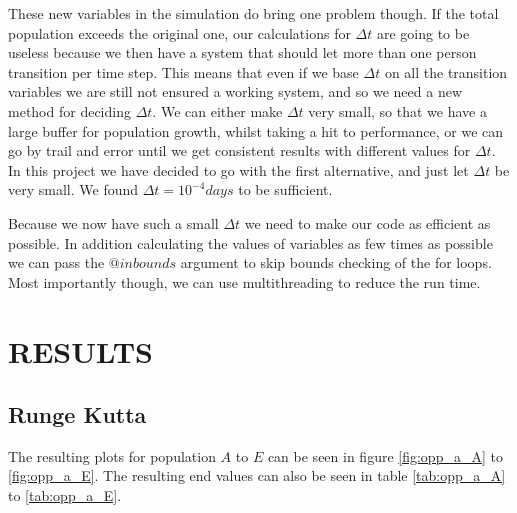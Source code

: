 \documentclass[a4paper]{article}
\let\Oldsection\section
\renewcommand{\section}{\FloatBarrier\Oldsection}
\let\Oldsubsection\subsection
\renewcommand{\subsection}{\FloatBarrier\Oldsubsection}
\begin{document}
	These new variables in the simulation do bring one problem though. If the total population exceeds the original one, our calculations for $\Delta t$ are going to be useless because we then have a system that should let more than one person transition per time step. This means that even if we base $\Delta t$ on all the transition variables we are still not ensured a working system, and so we need a new method for deciding $\Delta t$. We can either make $\Delta t$ very small, so that we have a large buffer for population growth, whilst taking a hit to performance, or we can go by trail and error until we get consistent results with different values for $\Delta t$. In this project we have decided to go with the first alternative, and just let $\Delta t$ be very small. We found $\Delta t = 10^{-4}days$ to be sufficient.
	
	Because we now have such a small $\Delta t$ we need to make our code as efficient as possible. In addition calculating the values of variables as few times as possible we can pass the $@inbounds$ argument to skip bounds checking of the for loops. Most importantly though, we can use multithreading to reduce the run time. 
	
	\section{RESULTS}
	
	
	\subsection{Runge Kutta}
	
	The resulting plots for population $A$ to $E$ can be seen in figure \ref{fig:opp_a_A} to \ref{fig:opp_a_E}. The resulting end values can also be seen in table \ref{tab:opp_a_A} to \ref{tab:opp_a_E}.
	
\end{document}
